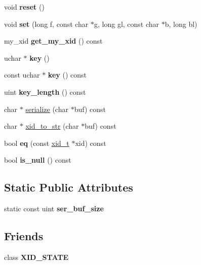 \begin{DoxyCompactItemize}
void {\bfseries reset} ()
\item 
\mbox{\label{structxid__t_a46ab8f5a0e149023592d775fec64b8b8}} 
void {\bfseries set} (long f, const char $\ast$g, long gl, const char $\ast$b, long bl)
\item 
\mbox{\label{structxid__t_a0c9955e2f9203bb4ff1cadab06e6d057}} 
my\+\_\+xid {\bfseries get\+\_\+my\+\_\+xid} () const
\item 
\mbox{\label{structxid__t_a78e3341549b2f382585301044a843784}} 
uchar $\ast$ {\bfseries key} ()
\item 
\mbox{\label{structxid__t_adef7b97fc51a4f9d3e4affe91429f9f8}} 
const uchar $\ast$ {\bfseries key} () const
\item 
\mbox{\label{structxid__t_a14fb36a37c7ab859001a37c1936bbf2b}} 
uint {\bfseries key\+\_\+length} () const
\item 
char $\ast$ \mbox{\hyperlink{structxid__t_a710d3e4dfa255380fcbc9165f4e89e3a}{serialize}} (char $\ast$buf) const
\item 
char $\ast$ \mbox{\hyperlink{structxid__t_afc1a393878eb80489d39a8cb77d95239}{xid\+\_\+to\+\_\+str}} (char $\ast$buf) const
\item 
\mbox{\label{structxid__t_a0cec09d5e19575b909f3e89575e8e9a1}} 
bool {\bfseries eq} (const \mbox{\hyperlink{structxid__t}{xid\+\_\+t}} $\ast$xid) const
\item 
\mbox{\label{structxid__t_aab143be3d0cbd57ff3afeaa45b6b9a22}} 
bool {\bfseries is\+\_\+null} () const
\end{DoxyCompactItemize}
\subsection*{Static Public Attributes}
\begin{DoxyCompactItemize}
\item 
static const uint {\bfseries ser\+\_\+buf\+\_\+size}
\end{DoxyCompactItemize}
\subsection*{Friends}
\begin{DoxyCompactItemize}
\item 
\mbox{\label{structxid__t_aede99569b7da3d9d63a09ba350c6231c}} 
class {\bfseries X\+I\+D\+\_\+\+S\+T\+A\+TE}
\end{DoxyCompactItemize}


